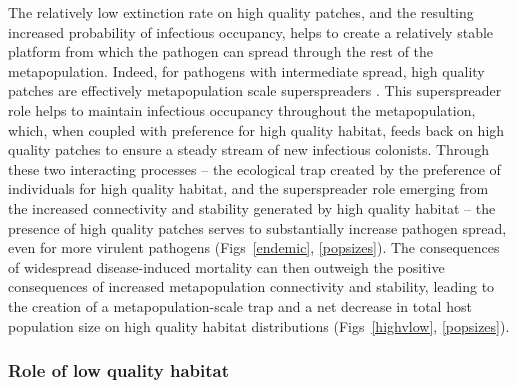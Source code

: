 \documentclass{article}
\begin{document}
The relatively low extinction rate on high quality patches, and the resulting increased probability of infectious occupancy, helps to create a relatively stable platform from which the pathogen can spread through the rest of the metapopulation.
Indeed, for pathogens with intermediate spread, high quality patches are effectively metapopulation scale superspreaders \cite{Lloyd-Smith2005, Paull2012}.  
This superspreader role helps to maintain infectious occupancy throughout the metapopulation, which, when coupled with preference for high quality habitat, feeds back on high quality patches to ensure a steady stream of new infectious colonists. 
Through these two interacting processes -- the ecological trap created by the preference of individuals for high quality habitat, and the superspreader role emerging from the increased connectivity and stability generated by high quality habitat -- the presence of high quality patches serves to substantially increase pathogen spread, even for more virulent pathogens (Figs~\ref{endemic}, \ref{popsizes}).
The consequences of widespread disease-induced mortality can then outweigh the positive consequences of increased metapopulation connectivity and stability, leading to the creation of a metapopulation-scale trap and a net decrease in total host population size on high quality habitat distributions (Figs~\ref{highvlow}, \ref{popsizes}).  

\subsubsection*{Role of low quality habitat}
\end{document}
